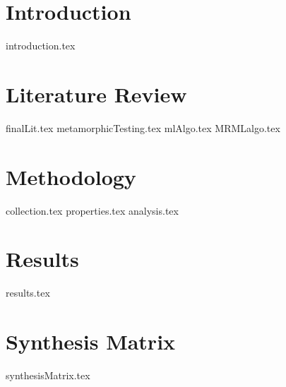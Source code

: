 \documentclass[print,ms]{unothesis}
\begin{document}
\mainmatter


\chapter{Introduction}
{introduction.tex}
% 

\chapter{Literature Review}
{finalLit.tex}
{metamorphicTesting.tex}
{mlAlgo.tex}
{MRMLalgo.tex}

\chapter{Methodology}
{collection.tex}
\newpage
{properties.tex}
\newpage
{analysis.tex}



\chapter{Results}
{results.tex}



\backmatter

\nocite{*}



\appendix
\chapter{Synthesis Matrix}
{synthesisMatrix.tex}
\end{document}
